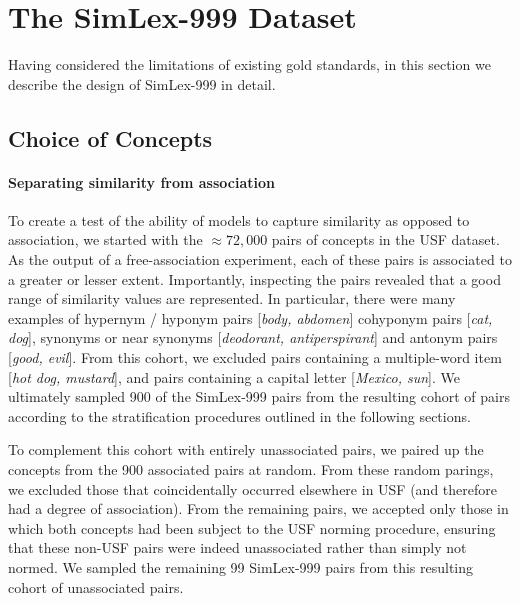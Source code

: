 \documentclass[fullname]{clv2}
\begin{document}
\section{The SimLex-999 Dataset} 

Having considered the limitations of existing gold standards, in this section we describe the design of SimLex-999 in detail. 

\subsection{Choice of Concepts}

\paragraph{Separating similarity from association}To create a test of the ability of models to capture similarity as opposed to association, we started with the \(\approx 72,000\) pairs of concepts in the USF dataset. As the output of a free-association experiment, each of these pairs is associated to a greater or lesser extent. Importantly, inspecting the pairs revealed that a good range of similarity values are represented. In particular, there were many examples of hypernym / hyponym pairs [\emph{body, abdomen}] cohyponym pairs [\emph{cat, dog}], synonyms or near synonyms [\emph{deodorant, antiperspirant}] and antonym pairs [\emph{good, evil}]. From this cohort, we excluded pairs containing a multiple-word item [\emph{hot dog, mustard}], and pairs containing a capital letter [\emph{Mexico, sun}]. We ultimately sampled 900 of the SimLex-999 pairs from the resulting cohort of pairs according to the stratification procedures outlined in the following sections. 


To complement this cohort with entirely unassociated pairs, we paired up the concepts from the 900 associated pairs at random. From these random parings, we excluded those that coincidentally occurred elsewhere in USF (and therefore had a degree of association). From the remaining pairs, we accepted only those in which both concepts had been subject to the USF norming procedure, ensuring that these non-USF pairs were indeed unassociated rather than simply not normed. We sampled the remaining 99 SimLex-999 pairs from this resulting cohort of unassociated pairs.  
\end{document}
